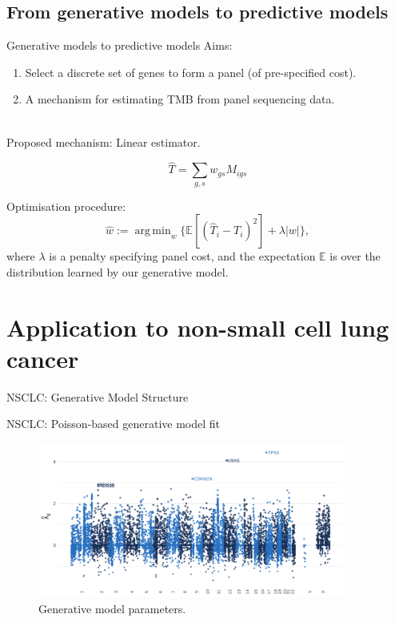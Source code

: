 \documentclass{beamer}
\DeclareMathOperator*{\argmin}{arg\,min}
\begin{document}
\subsection{From generative models to predictive models}
\begin{frame}{Generative models to predictive models}
Aims: 

\begin{enumerate}[1]
\item Select a discrete set of genes to form a panel (of pre-specified cost). 
\item A mechanism for estimating TMB from panel sequencing data.
\end{enumerate} 
~\\
Proposed mechanism: Linear estimator.

\begin{equation}
    \hat{T} = \sum_{g,s} w_{gs} M_{igs}
\end{equation}

Optimisation procedure:
\begin{equation}
    \hat{w} := \argmin_w \{ \mathbb{E}[(\hat{T}_i - T_i)^2] + \lambda |w|\},
\end{equation}
where $\lambda$ is a penalty specifying panel cost, and the expectation $\mathbb{E}$ is over the distribution learned by our generative model.
\end{frame}



\section{Application to non-small cell lung cancer}

\begin{frame}{NSCLC: Generative Model Structure}

\end{frame}

\begin{frame}{NSCLC: Poisson-based generative model fit}

\begin{figure}[htbp]
\centering
\includegraphics[width=4in]{figures/fig4.png}
\caption{Generative model parameters. \citep{bradley_data-driven_2021}\label{fig:3}}
\end{figure}
\end{frame}
\end{document}
